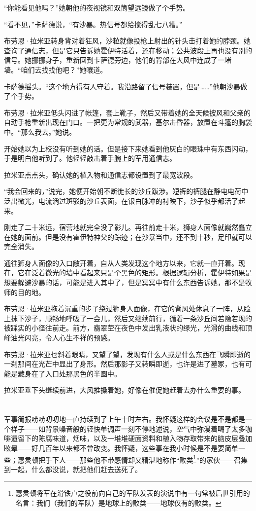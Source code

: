 \documentclass[AutoFakeBold=true]{book}
\begin{document}
``你能看见他吗？''她朝他的夜视镜和双筒望远镜做了个手势。

``看不见，''卡萨德说，``有沙暴。热信号都给搅得乱七八糟。''

布劳恩·拉米亚转身背对着狂风，沙粒就像投枪上射出的针头击打着她的脖颈。她查询了通信志，但是它只告诉她霍伊特活着，还在移动；公共波段上再也没有别的信号。她挪挪身子，重新回到卡萨德旁边，他们的背部在大风中连成了一堵墙。``咱们去找找他吧？''她嚷道。

卡萨德摇头。``这个地方得有人守着。我沿路留了信号装置，但是……''他朝沙暴做了个手势。

布劳恩·拉米亚低头闪进了帐篷，套上靴子，然后又带着她的全天候披风和父亲的自动手枪重新出现在门口。一把更为常规的武器，基尔击昏器，放置在斗篷的胸袋中。``那么我去。''她说。

开始她以为上校没有听到她的话。但是接下来她看到他灰白的眼珠中有东西闪动，于是明白他听到了。他轻轻敲击着手腕上的军用通信志。

拉米亚点点头，确认她的植入物和通信志都设置到了最宽波段。

``我会回来的，''说完，她便开始朝不断徙长的沙丘跋涉。短裤的裤腿在静电电荷中泛出微光，电流淌过斑驳的沙丘表面，在银白脉冲的衬映下，沙子似乎都活了起来。

刚走了二十米远，宿营地就完全没了影儿。再往前走十米，狮身人面像就巍然矗立在她的面前。但是没有霍伊特神父的踪迹；在沙暴当中，还不到十秒，足印就可以完全消失。

通往狮身人面像的入口敞开着，自从人类发现这个地方以来，它就一直开着。现在，它在泛着微光的墙中看起来只是个黑色的矩形。根据逻辑分析，霍伊特如果是想要躲避沙暴的话，可能是进入其中了，但是冥冥中有什么东西告诉她，那不是牧师的目的地。

布劳恩·拉米亚拖着沉重的步子绕过狮身人面像，在它的背风处休息了一阵，从脸上抹下沙子，顺畅地呼吸了一会儿，然后又继续前行，循着一条沙丘间若隐若现的被踩实的小径往前走。前方，翡翠茔在夜色中发出乳液状的绿光，光滑的曲线和顶峰油光闪亮，令人心生不祥的预感。

布劳恩·拉米亚乜斜着眼睛，又望了望，发现有什么人或是什么东西在飞瞬即逝的一刹那间在光芒中显出了身形。然后那影子又转瞬即逝，也许是进了墓冢，也有可能是藏身在了入口处那黑色的半圆中。

拉米亚垂下头继续前进，大风推搡着她，好像在催促她赶着去办什么重要的事。

\chapter{}

军事简报唠唠叨叨地一直持续到了上午十时左右。我怀疑这样的会议是不是都是一个样子——如背景噪音般的轻快单调声一刻不停地述说，空气中弥漫着喝了太多咖啡遗留下的陈腐味道，烟味，以及一堆堆硬面资料和植入物存取带来的脑皮层叠加眩晕——好几百年以来都不曾改变。我怀疑，这些事在我小时候是不是要简单一些；惠灵顿把手下人——那些他不带感情却又精湛地称作``败类\footnote{惠灵顿将军在滑铁卢之役前向自己的军队发表的演说中有一句常被后世引用的名言：我们（我们的军队）是地球上的败类——地球仅有的败类。}''的家伙——召集到一起，什么都没说，就把他们赶去送死了。
\end{document}
